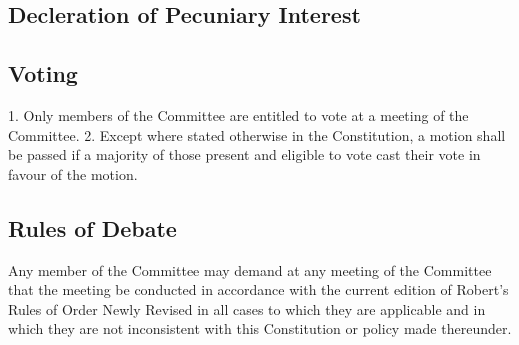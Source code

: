 \documentclass[12pt]{article} %
\begin{document}
\subsection{Decleration of Pecuniary Interest}
\subsection{Voting}
1. Only members of the Committee are entitled to vote at a meeting of the
Committee.
2. Except where stated otherwise in the Constitution, a motion shall be passed if
a majority of those present and eligible to vote cast their vote in favour of the
motion.
\subsection{Rules of Debate}
Any member of the Committee may demand at any meeting of the Committee that
the meeting be conducted in accordance with the current edition of Robert’s Rules of
Order Newly Revised in all cases to which they are applicable and in which they are
not inconsistent with this Constitution or policy made thereunder.
\end{document}
